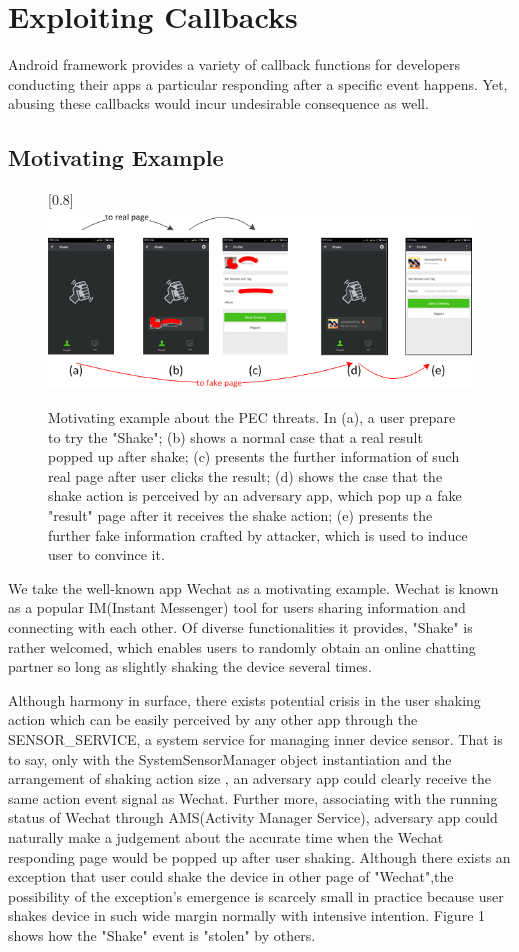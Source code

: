 \documentclass{sig-alternate-05-2015}
\begin{document}
\section{Exploiting Callbacks}
Android framework provides a variety of callback functions for developers conducting their apps a particular responding after a specific event happens. Yet, abusing these callbacks would incur undesirable consequence as well.
\subsection{Motivating Example}

\begin{figure}[t]
\centering
\scalebox{1}[0.8]{\includegraphics{pic1.png}}
\caption{\label{} Motivating example about the PEC threats. In (a), a user prepare to try the "Shake"; (b) shows a normal case that a real result popped up after shake; (c) presents the further information of such real page after user clicks the result; (d) shows the case that the shake action is perceived by an adversary app, which pop up a fake "result" page after it receives the shake action; (e) presents the further fake information crafted by attacker, which is used to induce user to convince it.}
\end{figure}

We take the well-known app Wechat as a motivating example. Wechat is known as a popular IM(Instant Messenger) tool for users sharing information and connecting with each other. Of diverse functionalities it provides, "Shake" is rather welcomed, which enables users to randomly obtain an online chatting partner so long as slightly shaking the device several times.

Although harmony in surface, there exists potential crisis in the user shaking action which can be easily perceived by any other app through the {\color{red}SENSOR\_SERVICE}, a system service for managing inner device sensor. That is to say, only with the {\color{red}SystemSensorManager} object instantiation and the arrangement of shaking action size , an adversary app could clearly receive the same action event signal as Wechat. Further more, associating with the running status of Wechat through {\color{red}AMS(Activity Manager Service)}, adversary app could naturally make a judgement about the accurate time when the Wechat responding page would be popped up after user shaking. Although there exists an exception that user could shake the device in other page of "Wechat",the possibility of the exception's emergence is scarcely small in practice because user shakes device in such wide margin normally with intensive intention. {\color{red}Figure 1} shows how the "Shake" event is "stolen" by others. 
\end{document}
